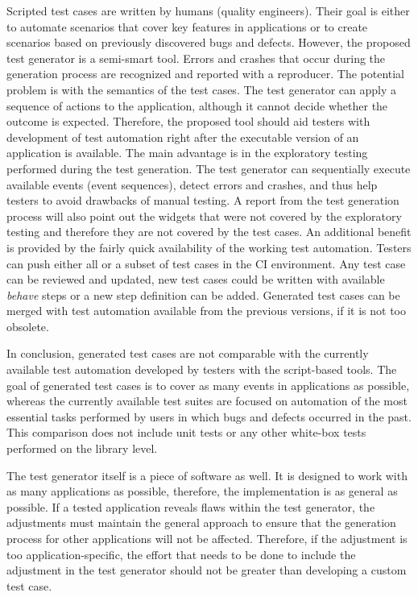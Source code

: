 Scripted test cases are written by humans (quality engineers). Their goal is either to automate scenarios that cover key features in applications or to create scenarios based on previously discovered bugs and defects. However, the proposed test generator is a semi-smart tool. Errors and crashes that occur during the generation process are recognized and reported with a reproducer. The potential problem is with the semantics of the test cases. The test generator can apply a sequence of actions to the application, although it cannot decide whether the outcome is expected. Therefore, the proposed tool should aid testers with development of test automation right after the executable version of an application is available. The main advantage is in the exploratory testing performed during the test generation. The test generator can sequentially execute available events (event sequences), detect errors and crashes, and thus help testers to avoid drawbacks of manual testing. A report from the test generation process will also point out the widgets that were not covered by the exploratory testing and therefore they are not covered by the test cases. An additional benefit is provided by the fairly quick availability of the working test automation. Testers can push either all or a subset of test cases in the CI environment. Any test case can be reviewed and updated, new test cases could be written with available \textit{behave} steps or a new step definition can be added. Generated test cases can be merged with test automation available from the previous versions, if it is not too obsolete.

In conclusion, generated test cases are not comparable with the currently available test automation developed by testers with the script-based tools. The goal of generated test cases is to cover as many events in applications as possible, whereas the currently available test suites are focused on automation of the most essential tasks performed by users in which bugs and defects occurred in the past. This comparison does not include unit tests or any other white-box tests performed on the library level.

The test generator itself is a piece of software as well. It is designed to work with as many applications as possible, therefore, the implementation is as general as possible. If a tested application reveals flaws within the test generator, the adjustments must maintain the general approach to ensure that the generation process for other applications will not be affected. Therefore, if the adjustment is too application-specific, the effort that needs to be done to include the adjustment in the test generator should not be greater than developing a custom test case.

